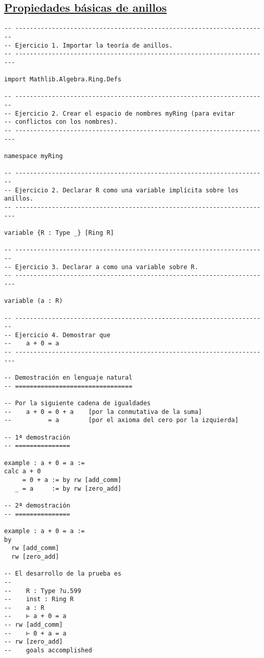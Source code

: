 \subsection{\href{./src/Basicos/Propiedades\_basicas\_de\_anillos.lean}{Propiedades básicas de anillos}}
\label{sec:orge05f9df}
\begin{verbatim}
-- ---------------------------------------------------------------------
-- Ejercicio 1. Importar la teoría de anillos.
-- ----------------------------------------------------------------------

import Mathlib.Algebra.Ring.Defs

-- ---------------------------------------------------------------------
-- Ejercicio 2. Crear el espacio de nombres myRing (para evitar
-- conflictos con los nombres).
-- ----------------------------------------------------------------------

namespace myRing

-- ---------------------------------------------------------------------
-- Ejercicio 2. Declarar R como una variable implícita sobre los anillos.
-- ----------------------------------------------------------------------

variable {R : Type _} [Ring R]

-- ---------------------------------------------------------------------
-- Ejercicio 3. Declarar a como una variable sobre R.
-- ----------------------------------------------------------------------

variable (a : R)

-- ---------------------------------------------------------------------
-- Ejercicio 4. Demostrar que
--    a + 0 = a
-- ----------------------------------------------------------------------

-- Demostración en lenguaje natural
-- ================================

-- Por la siguiente cadena de igualdades
--    a + 0 = 0 + a    [por la conmutativa de la suma]
--          = a        [por el axioma del cero por la izquierda]

-- 1ª demostración
-- ===============

example : a + 0 = a :=
calc a + 0
     = 0 + a := by rw [add_comm]
   _ = a     := by rw [zero_add]

-- 2ª demostración
-- ===============

example : a + 0 = a :=
by
  rw [add_comm]
  rw [zero_add]

-- El desarrollo de la prueba es
--
--    R : Type ?u.599
--    inst : Ring R
--    a : R
--    ⊢ a + 0 = a
-- rw [add_comm]
--    ⊢ 0 + a = a
-- rw [zero_add]
--    goals accomplished


\end{verbatim}
